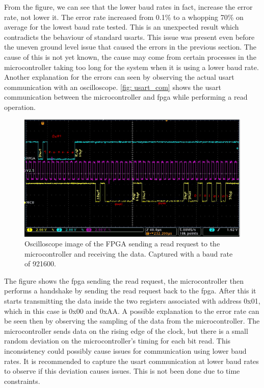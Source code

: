 \documentclass[main.tex]{subfiles}
\begin{document}
From the figure, we can see that the lower baud rates in fact, increase the error rate, not lower it. The error rate increased from 0.1\% to a whopping 70\% on average for the lowest baud rate tested. This is an unexpected result which contradicts the behaviour of standard \gls{usart}s. This issue was present even before the uneven ground level issue that caused the errors in the previous section. The cause of this is not yet known, the cause may come from certain processes in the microcontroller taking too long for the system when it is using a lower baud rate. Another explanation for the errors can seen by observing the actual \gls{usart} communication with an oscilloscope. \autoref{fig: usart_com} shows the \gls{usart} communication between the microcontroller and \gls{fpga} while performing a read operation.

\begin{figure}[!ht]
    \centering
    \includegraphics[width=18cm]{images/USARTTransaction.png}
    \caption{Oscilloscope image of the FPGA sending a read request to the microcontroller and receiving the data. Captured with a baud rate of 921600.}
    \label{fig: usart_com}
\end{figure}
\FloatBarrier

The figure shows the \gls{fpga} sending the read request, the microcontroller then performs a handshake by sending the read request back to the \gls{fpga}. After this it starts transmitting the data inside the two registers associated with address 0x01, which in this case is 0x00 and 0xAA. A possible explanation to the error rate can be seen then by observing the sampling of the data from the microcontroller. The microcontroller sends data on the rising edge of the clock, but there is a small random deviation on the microcontroller's timing for each bit read. This inconsistency could possibly cause issues for communication using lower baud rates. It is recommended to capture the \gls{usart} communication at lower baud rates to observe if this deviation causes issues. This is not been done due to time constraints.
\end{document}
